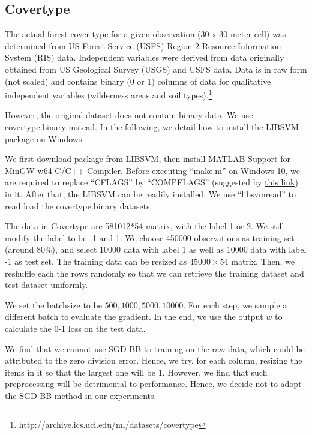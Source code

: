 \documentclass[conference,onecolumn,12pt]{IEEEtran}
\renewcommand{\(}{\left(}
\renewcommand{\)}{\right)}
\numberwithin{equation}{section}
\numberwithin{figure}{section}
\numberwithin{table}{section}
\theoremstyle{definition}
\begin{document}
  

\clearpage
\subsection{Covertype}\label{sec:c}
The actual forest cover type for a given observation (30 x 30 meter cell) was determined from US Forest Service (USFS) Region 2 Resource Information System (RIS) data. \cite{blackard2000comparison} Independent variables were derived from data originally obtained from US Geological Survey (USGS) and USFS data. Data is in raw form (not scaled) and contains binary (0 or 1) columns of data for qualitative independent variables (wilderness areas and soil types).\footnote{http://archive.ics.uci.edu/ml/datasets/covertype}
  
However, the original dataset does not contain binary data. We use \href{https://www.csie.ntu.edu.tw/~cjlin/libsvmtools/datasets/binary.html}{covertype.binary} instead. In the following, we detail how to install the LIBSVM package on Windows.

We first download package from \href{https://www.csie.ntu.edu.tw/~cjlin/libsvm/#download}{LIBSVM}, then install \href{https://www.mathworks.com/matlabcentral/fileexchange/52848-matlab-support-for-mingw-w64-c-c-compiler}{MATLAB Support for MinGW-w64 C/C++ Compiler}. Before executing ``make.m'' on Windows 10, we are required to replace ``CFLAGS'' by ``COMPFLAGS'' (suggested by \href{https://github.com/cjlin1/libsvm/issues/55}{this link}) in it. After that, the LIBSVM can be readily installed. We use ``libsvmread'' to read load the covertype.binary datasets.

The data in Covertype are 581012*54 matrix, with the label 1 or 2. We still modify the label to be -1 and 1. We choose 450000 observations as training set (around 80\%), and select 10000 data with label 1 as well as 10000 data with label -1 as test set. The training data can be resized as $45000\times 54$ matrix. Then, we reshuffle each the rows randomly so that we can retrieve the training dataset and test dataset uniformly.

  We set the batchsize to be $500,1000,5000,10000$. For each step, we sample a different batch to evaluate the gradient. In the end, we use the output $w$ to calculate the 0-1 loss on the test data.

We find that we cannot use SGD-BB to training on the raw data, which could be attributed to the zero division error. Hence, we try, for each column, resizing the items in it so that the largest one will be 1. However, we find that such preprocessing will be detrimental to performance. Hence, we decide not to adopt the SGD-BB method in our experiments.
\end{document}
